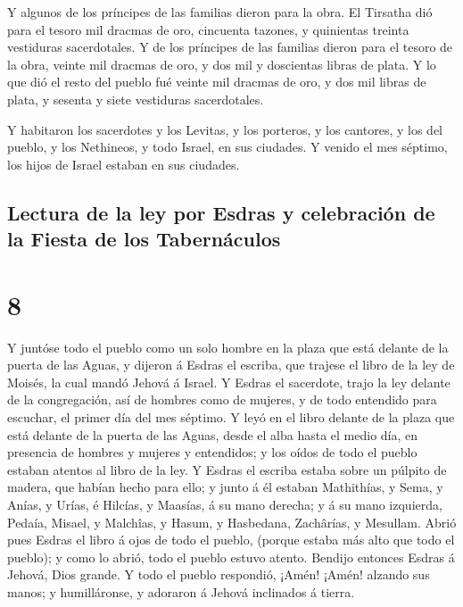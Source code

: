  Y algunos de los príncipes de las familias dieron para
la obra. El Tirsatha dió para el tesoro mil dracmas de oro, cincuenta
tazones, y quinientas treinta vestiduras sacerdotales.  Y
de los príncipes de las familias dieron para el tesoro de la obra,
veinte mil dracmas de oro, y dos mil y doscientas libras de plata.
 Y lo que dió el resto del pueblo fué veinte mil dracmas
de oro, y dos mil libras de plata, y sesenta y siete vestiduras
sacerdotales.

 Y habitaron los sacerdotes y los Levitas, y los
porteros, y los cantores, y los del pueblo, y los Nethineos, y todo
Israel, en sus ciudades. Y venido el mes séptimo, los hijos de Israel
estaban en sus ciudades.

\hypertarget{lectura-de-la-ley-por-esdras-y-celebraciuxf3n-de-la-fiesta-de-los-tabernuxe1culos}{%
\subsection{Lectura de la ley por Esdras y celebración de la Fiesta de
los
Tabernáculos}\label{lectura-de-la-ley-por-esdras-y-celebraciuxf3n-de-la-fiesta-de-los-tabernuxe1culos}}

\hypertarget{section-16-8}{%
\section{8}\label{section-16-8}}

 Y juntóse todo el pueblo como un solo hombre en la plaza
que está delante de la puerta de las Aguas, y dijeron á Esdras el
escriba, que trajese el libro de la ley de Moisés, la cual mandó Jehová
á Israel.  Y Esdras el sacerdote, trajo la ley delante de
la congregación, así de hombres como de mujeres, y de todo entendido
para escuchar, el primer día del mes séptimo.  Y leyó en
el libro delante de la plaza que está delante de la puerta de las Aguas,
desde el alba hasta el medio día, en presencia de hombres y mujeres y
entendidos; y los oídos de todo el pueblo estaban atentos al libro de la
ley.  Y Esdras el escriba estaba sobre un púlpito de
madera, que habían hecho para ello; y junto á él estaban Mathithías, y
Sema, y Anías, y Urías, é Hilcías, y Maasías, á su mano derecha; y á su
mano izquierda, Pedaía, Misael, y Malchîas, y Hasum, y Hasbedana,
Zachârías, y Mesullam.  Abrió pues Esdras el libro á ojos
de todo el pueblo, (porque estaba más alto que todo el pueblo); y como
lo abrió, todo el pueblo estuvo atento.  Bendijo entonces
Esdras á Jehová, Dios grande. Y todo el pueblo respondió, ¡Amén! ¡Amén!
alzando sus manos; y humilláronse, y adoraron á Jehová inclinados á
tierra.

